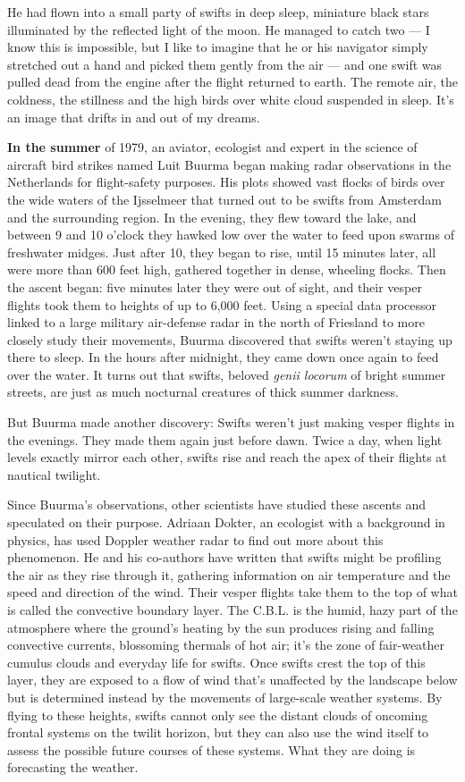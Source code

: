 He had flown into a small party of swifts in deep sleep, miniature black
stars illuminated by the reflected light of the moon. He managed to
catch two --- I know this is impossible, but I like to imagine that he
or his navigator simply stretched out a hand and picked them gently from
the air --- and one swift was pulled dead from the engine after the
flight returned to earth. The remote air, the coldness, the stillness
and the high birds over white cloud suspended in sleep. It's an image
that drifts in and out of my dreams.

\textbf{In the summer} of 1979, an aviator, ecologist and expert in the
science of aircraft bird strikes named Luit Buurma began making radar
observations in the Netherlands for flight-safety purposes. His plots
showed vast flocks of birds over the wide waters of the Ijsselmeer that
turned out to be swifts from Amsterdam and the surrounding region. In
the evening, they flew toward the lake, and between 9 and 10 o'clock
they hawked low over the water to feed upon swarms of freshwater midges.
Just after 10, they began to rise, until 15 minutes later, all were more
than 600 feet high, gathered together in dense, wheeling flocks. Then
the ascent began: five minutes later they were out of sight, and their
vesper flights took them to heights of up to 6,000 feet. Using a special
data processor linked to a large military air-defense radar in the north
of Friesland to more closely study their movements, Buurma discovered
that swifts weren't staying up there to sleep. In the hours after
midnight, they came down once again to feed over the water. It turns out
that swifts, beloved \emph{genii locorum} of bright summer streets, are
just as much nocturnal creatures of thick summer darkness.

But Buurma made another discovery: Swifts weren't just making vesper
flights in the evenings. They made them again just before dawn. Twice a
day, when light levels exactly mirror each other, swifts rise and reach
the apex of their flights at nautical twilight.

Since Buurma's observations, other scientists have studied these ascents
and speculated on their purpose. Adriaan Dokter, an ecologist with a
background in physics, has used Doppler weather radar to find out more
about this phenomenon. He and his co-authors have written that swifts
might be profiling the air as they rise through it, gathering
information on air temperature and the speed and direction of the wind.
Their vesper flights take them to the top of what is called the
convective boundary layer. The C.B.L. is the humid, hazy part of the
atmosphere where the ground's heating by the sun produces rising and
falling convective currents, blossoming thermals of hot air; it's the
zone of fair-weather cumulus clouds and everyday life for swifts. Once
swifts crest the top of this layer, they are exposed to a flow of wind
that's unaffected by the landscape below but is determined instead by
the movements of large-scale weather systems. By flying to these
heights, swifts cannot only see the distant clouds of oncoming frontal
systems on the twilit horizon, but they can also use the wind itself to
assess the possible future courses of these systems. What they are doing
is forecasting the weather.

